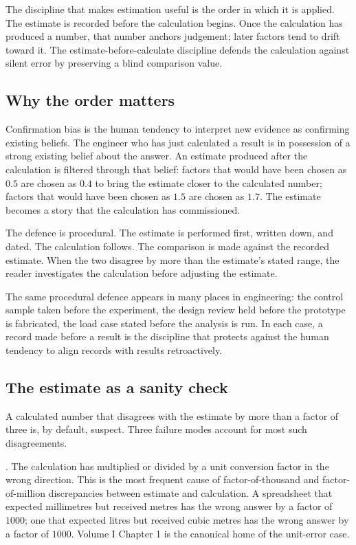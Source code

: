 The discipline that makes estimation useful is the order in which it is
applied. The estimate is recorded before the calculation begins. Once
the calculation has produced a number, that number anchors judgement;
later factors tend to drift toward it. The estimate-before-calculate
discipline defends the calculation against silent error by preserving
a blind comparison value.

\subsection{Why the order matters}

Confirmation bias is the human tendency to interpret new evidence as
confirming existing beliefs. The engineer who has just calculated a
result is in possession of a strong existing belief about the answer.
An estimate produced after the calculation is filtered through that
belief: factors that would have been chosen as $0.5$ are chosen as
$0.4$ to bring the estimate closer to the calculated number; factors
that would have been chosen as $1.5$ are chosen as $1.7$. The estimate
becomes a story that the calculation has commissioned.

The defence is procedural. The estimate is performed first, written
down, and dated. The calculation follows. The comparison is made
against the recorded estimate. When the two disagree by more than the
estimate's stated range, the reader investigates the calculation
before adjusting the estimate.

The same procedural defence appears in many places in engineering: the
control sample taken before the experiment, the design review held
before the prototype is fabricated, the load case stated before the
analysis is run. In each case, a record made before a result is the
discipline that protects against the human tendency to align records
with results retroactively.

\subsection{The estimate as a sanity check}

A calculated number that disagrees with the estimate by more than a
factor of three is, by default, suspect. Three failure modes account
for most such disagreements.

. The calculation has multiplied or divided by a
unit conversion factor in the wrong direction. This is the most
frequent cause of factor-of-thousand and factor-of-million
discrepancies between estimate and calculation. A spreadsheet that
expected millimetres but received metres has the wrong answer by a
factor of $1000$; one that expected litres but received cubic metres
has the wrong answer by a factor of $1000$. Volume I Chapter 1 is the
canonical home of the unit-error case.

